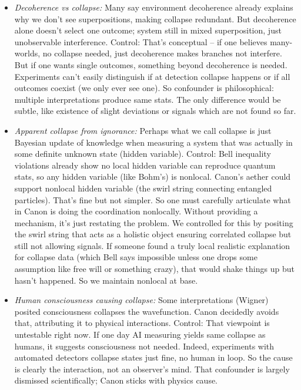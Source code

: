 \documentclass[11pt]{article}
\begin{document}
\begin{itemize}

\item 
\textit{Decoherence vs collapse:} Many say environment decoherence already explains why we don’t see superpositions, making collapse redundant. But decoherence alone doesn’t select one outcome; system still in mixed superposition, just unobservable interference. Control: That’s conceptual – if one believes many-worlds, no collapse needed, just decoherence makes branches not interfere. But if one wants single outcomes, something beyond decoherence is needed. Experiments can’t easily distinguish if at detection collapse happens or if all outcomes coexist (we only ever see one). So confounder is philosophical: multiple interpretations produce same stats. The only difference would be subtle, like existence of slight deviations or signals which are not found so far.




\item 
\textit{Apparent collapse from ignorance:} Perhaps what we call collapse is just Bayesian update of knowledge when measuring a system that was actually in some definite unknown state (hidden variable). Control: Bell inequality violations already show no local hidden variable can reproduce quantum stats, so any hidden variable (like Bohm's) is nonlocal. Canon’s aether could support nonlocal hidden variable (the swirl string connecting entangled particles). That’s fine but not simpler. So one must carefully articulate what in Canon is doing the coordination nonlocally. Without providing a mechanism, it’s just restating the problem. We controlled for this by positing the swirl string that acts as a holistic object ensuring correlated collapse but still not allowing signals. If someone found a truly local realistic explanation for collapse data (which Bell says impossible unless one drops some assumption like free will or something crazy), that would shake things up but hasn't happened. So we maintain nonlocal at base.




\item 
\textit{Human consciousness causing collapse:} Some interpretations (Wigner) posited consciousness collapses the wavefunction. Canon decidedly avoids that, attributing it to physical interactions. Control: That viewpoint is untestable right now. If one day AI measuring yields same collapse as humans, it suggests consciousness not needed. Indeed, experiments with automated detectors collapse states just fine, no human in loop. So the cause is clearly the interaction, not an observer’s mind. That confounder is largely dismissed scientifically; Canon sticks with physics cause.





\end{itemize}
\end{document}
